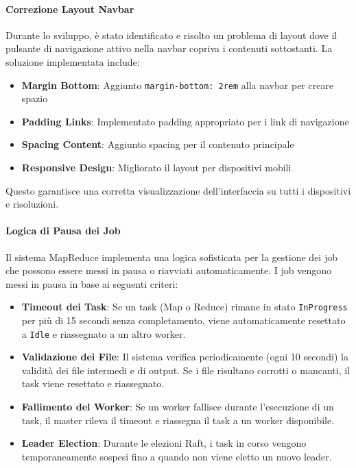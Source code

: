 \documentclass[12pt,a4paper]{article}
\begin{document}
\paragraph{Correzione Layout Navbar}
Durante lo sviluppo, è stato identificato e risolto un problema di layout dove il pulsante di navigazione attivo nella navbar copriva i contenuti sottostanti. La soluzione implementata include:

\begin{itemize}
\item \textbf{Margin Bottom}: Aggiunto \texttt{margin-bottom: 2rem} alla navbar per creare spazio
\item \textbf{Padding Links}: Implementato padding appropriato per i link di navigazione
\item \textbf{Spacing Content}: Aggiunto spacing per il contenuto principale
\item \textbf{Responsive Design}: Migliorato il layout per dispositivi mobili
\end{itemize}

Questo garantisce una corretta visualizzazione dell'interfaccia su tutti i dispositivi e risoluzioni.

\paragraph{Logica di Pausa dei Job}
Il sistema MapReduce implementa una logica sofisticata per la gestione dei job che possono essere messi in pausa o riavviati automaticamente. I job vengono messi in pausa in base ai seguenti criteri:

\begin{itemize}
\item \textbf{Timeout dei Task}: Se un task (Map o Reduce) rimane in stato \texttt{InProgress} per più di 15 secondi senza completamento, viene automaticamente resettato a \texttt{Idle} e riassegnato a un altro worker.

\item \textbf{Validazione dei File}: Il sistema verifica periodicamente (ogni 10 secondi) la validità dei file intermedi e di output. Se i file risultano corrotti o mancanti, il task viene resettato e riassegnato.

\item \textbf{Fallimento del Worker}: Se un worker fallisce durante l'esecuzione di un task, il master rileva il timeout e riassegna il task a un worker disponibile.

\item \textbf{Leader Election}: Durante le elezioni Raft, i task in corso vengono temporaneamente sospesi fino a quando non viene eletto un nuovo leader.
\end{itemize}
\end{document}
